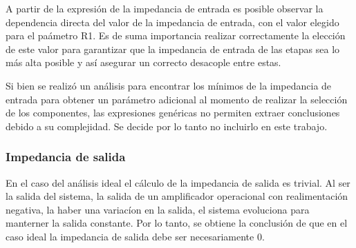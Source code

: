 A partir de la expresi\'on de la impedancia de entrada es posible observar la dependencia directa del valor de la impedancia de entrada, con el valor elegido para el pa\'ametro R1. Es de suma importancia realizar correctamente la elecci\'on de este valor para garantizar que la impedancia de entrada de las etapas sea lo m\'as alta posible y as\'i asegurar un correcto desacople entre estas.

Si bien se realiz\'o un an\'alisis para encontrar los m\'inimos de la impedancia de entrada para obtener un par\'ametro adicional al momento de realizar la selecci\'on de los componentes, las expresiones gen\'ericas no permiten extraer conclusiones debido a su complejidad. Se decide por lo tanto no incluirlo en este trabajo. 


\subsubsection{Impedancia de salida}
En el caso del an\'alisis ideal el c\'alculo de la impedancia de salida es trivial. Al ser la salida del sistema, la salida de un amplificador operacional con realimentaci\'on negativa, la haber una variac\'ion en la salida, el sistema evoluciona para manterner la salida constante. Por lo tanto, se obtiene la conclusi\'on de que en el caso ideal la impedancia de salida debe ser necesariamente 0.

